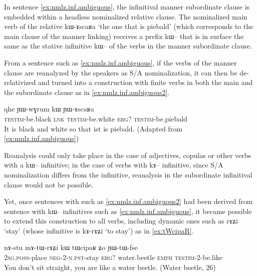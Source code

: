 \documentclass[oldfontcommands,oneside,a4paper,11pt]{article}
\newcommand{\ipa}[1]{{\phon #1}} %
\begin{document}
In sentence \ref{ex:nmlz.inf.ambiguous}, the infinitival manner subordinate clause is embedded within a headless nominalized relative clause. The nominalized main verb of the relative \ipa{kɯ-ɤscaʁa} `the one that is piebald' (which corresponds to the main clause of the manner linking) receives a prefix \ipa{kɯ--} that is in surface the same as the stative infinitive \ipa{kɯ--} of the verbs in the manner subordinate clause.

From a sentence such as \ref{ex:nmlz.inf.ambiguous}, if the verbs of the manner clause are reanalyzed by the speakers as S/A nominalization, it can then be de-relativized and turned into a construction with finite verbs in both the main and the subordinate clause as in \ref{ex:nmlz.inf.ambiguous2}. 

 \begin{exe}
\ex \label{ex:nmlz.inf.ambiguous2}
\gll   \ipa{ɲɯ-ɲaʁ}  	\ipa{qhe}  	\ipa{ɲɯ-wɣrum}  	\ipa{kɯ} 	\ipa{ɲɯ-ɤscaʁa}  \\
   \textsc{testim}-be.black \textsc{lnk} \textsc{testim}-be.white \textsc{erg?} \textsc{testim}-be.piebald  \ \\
\glt It is black and white so that ist is piebald. (Adapted from \ref{ex:nmlz.inf.ambiguous}) %
\end{exe}
 
Reanalysis could only take place in the case of adjectives, copulas or other verbs with a \ipa{kɯ--} infinitive; in the case of verbs with \ipa{kɤ--} infinitive, since S/A nominalization differs from the infinitive, reanalysis in the subordinate infinitival clause would not be possible. 

Yet, once sentences with such as \ref{ex:nmlz.inf.ambiguous2} had been derived from sentence with \ipa{kɯ--} infinitives such as \ref{ex:nmlz.inf.ambiguous}, it became possible to extend this construction to all verbs, including dynamic ones such as \ipa{rɤʑi} `stay' (whose infinitive is \ipa{kɤ-rɤʑi} `to stay') as in \ref{ex:tWcipaR}.

  \begin{exe}
\ex \label{ex:tWcipaR}
\gll 
\ipa{nɤ-stu}  	\ipa{mɤ-tɯ-rɤʑi}  	\ipa{kɯ}  	\ipa{tɯcipaʁ}  	\ipa{ʑo}  	\ipa{ɲɯ-tɯ-fse}  \\
\textsc{2sg.poss}-place \textsc{neg-2-n.pst}-stay \textsc{erg?} water.beetle \textsc{emph} \textsc{testim}-2-be.like \\
\glt You don't sit straight, you are like a water beetle.  (Water beetle, 26)
 \end{exe}
 
\end{document}
